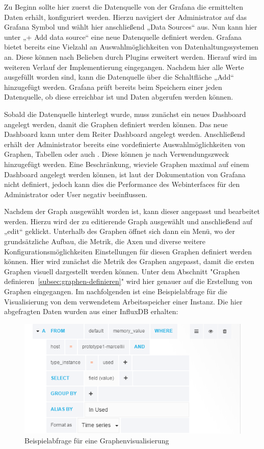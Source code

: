 {Zu Beginn sollte hier zuerst die Datenquelle von der Grafana die ermittelten
Daten erhält, konfiguriert werden. Hierzu navigiert der Administrator auf das
Grafana Symbol und wählt hier anschließend „Data Sources“ aus. Nun kann hier
unter „+ Add data source“ eine neue Datenquelle definiert werden. Grafana
bietet bereits eine Vielzahl an Auswahlmöglichkeiten von Datenhaltungssystemen
an. Diese können nach Belieben durch Plugins erweitert werden. Hierauf wird im
weiteren Verlauf der Implementierung eingegangen. Nachdem hier alle Werte
ausgefüllt worden sind, kann die Datenquelle über die Schaltfläche „Add“
hinzugefügt werden. Grafana prüft bereits beim Speichern einer jeden
Datenquelle, ob diese erreichbar ist und Daten abgerufen werden können.

Sobald die Datenquelle hinterlegt wurde, muss zunächst ein neues Dashboard
angelegt werden, damit die Graphen definiert werden können. Das neue Dashboard
kann unter dem Reiter Dashboard angelegt werden. Anschließend erhält der
Administrator bereits eine vordefinierte Auswahlmöglichkeiten von Graphen,
Tabellen oder auch . Diese können je nach
Verwendungszweck hinzugefügt werden. Eine Beschränkung, wieviele Graphen
maximal auf einem Dashboard angelegt werden können, ist laut der Dokumentation
von Grafana nicht definiert, jedoch kann dies die Performance des Webinterfaces
für den Administrator oder User negativ beeinflussen.

Nachdem der Graph ausgewählt worden ist, kann dieser angepasst und bearbeitet
werden. Hierzu wird der zu editierende Graph ausgewählt und anschließend auf
„edit“ geklickt. Unterhalb des Graphen öffnet sich dann ein Menü, wo der
grundsätzliche Aufbau, die Metrik, die Axen und diverse weitere
Konfigurationsmöglichkeiten Einstellungen für diesen Graphen definiert werden
können. Hier wird zunächst die Metrik des Graphen angepasst, damit die ersten
Graphen visuell dargestellt werden können. Unter dem Abschnitt "Graphen
definieren~\ref{subsec:graphen-definieren}" wird hier genauer auf die
Erstellung von Graphen eingegangen. Im nachfolgenden ist eine Beispielabfrage
für die Visualisierung von dem verwendetem Arbeitsspeicher einer Instanz. Die
hier abgefragten Daten wurden aus einer InfluxDB erhalten:

\begin{figure}[H]
  \centering
  \includegraphics[width=1.0\textwidth]{../figures/graph.png}
  \caption{Beispielabfrage für eine Graphenvisualisierung}
\label{figure:graph}
\end{figure}

}
